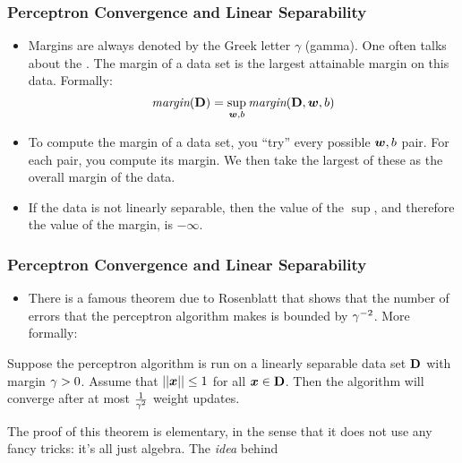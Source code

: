 \documentclass[trans]{beamer}
\begin{document}
\begin{frame}
  \frametitle{Perceptron Convergence and Linear Separability}
\begin{itemize}
\item Margins
are always denoted by the Greek letter $\gamma$ (gamma).  One often
talks about the .  The margin of a data
set is the largest attainable margin on this data.  Formally:
\begin{equation} \label{eq:margin2}
\textit{margin}(\text{\bf D})
= 
\sup_{{\boldsymbol{w}},b} \textit{margin}(\text{\bf D}, {\boldsymbol{w}}, b)
\end{equation}
\item To compute the margin of a data set, you ``try'' every
possible ${\boldsymbol{w}},b$ pair.  For each pair, you compute its margin.  We
then take the largest of these as the overall margin of the
data.%
\item     If the data is not linearly separable, then the value
of the $\sup$, and therefore the value of the margin, is $-\infty$.
\end{itemize}
\end{frame}
\begin{frame}
  \frametitle{Perceptron Convergence and Linear Separability}
\begin{itemize}
\item
There is a famous theorem due to
Rosenblatt %
that shows that the number
of errors that the perceptron algorithm makes is bounded by
$\gamma^{-2}$.  More formally:
\end{itemize}
\begin{theorem} \label{thm:perc:perc}
  Suppose the perceptron algorithm is run on a linearly separable data
  set $\text{\bf D}$ with margin $\gamma > 0$.  Assume that $\left\vert\left\vert {\boldsymbol{x}} \right\vert\right\vert \leq 1$
  for all ${\boldsymbol{x}} \in \text{\bf D}$.  Then the algorithm will converge after at
  most $\frac 1 {\gamma^2}$ weight updates.
\end{theorem}

\end{frame}
\iffalse
The proof of this theorem is elementary, in the sense that it does not
use any fancy tricks: it's all just algebra.  The \emph{idea} behind
\end{document}
